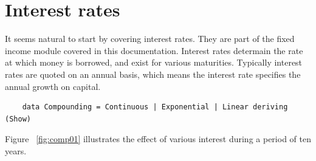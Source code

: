 \documentclass[11pt,a4paper]{article}
\numberwithin{equation}{section}
\begin{document}

	\section{Interest rates}
	It seems natural to start by covering interest rates. They are part of the fixed income module covered in this documentation.
	Interest rates determain the rate at which money is borrowed, and exist for various maturities. Typically interest rates are quoted on an annual basis, which means the 	interest rate specifies the annual growth on capital.


	\FrameSep
	\begin{lstlisting}
	data Compounding = Continuous | Exponential | Linear deriving (Show)
	\end{lstlisting}
	\FrameSep

	Figure ~\ref{fig:comp01} illustrates the effect of various interest during a period of ten years.

	\begin{minipage}{\linewidth}
	\label{fig:comp01}
	\end{minipage}
\end{document}
